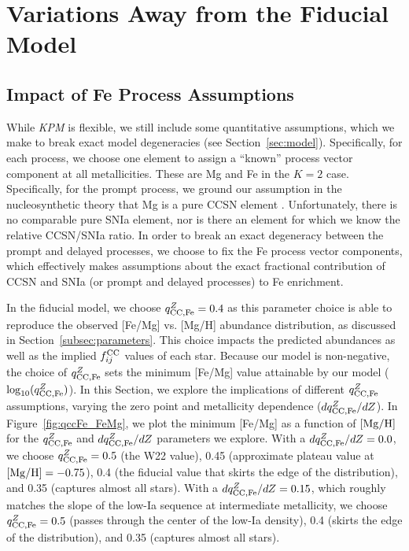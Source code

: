 \documentclass[modern]{aastex631}
\newcommand{\mgh}{[{\rm Mg}/{\rm H}]}
\newcommand{\qccFe}{q_{{\rm CC, Fe}}^{Z}}
\newcommand{\dqccFe}{dq_{{\rm CC, Fe}}^{Z}/dZ}
\newcommand{\fcc}{f_{ij}^{\rm CC}}
\newcommand{\name}{\textsl{KPM}}
\begin{document}
\section{Variations Away from the Fiducial Model} \label{sec:variations}

\subsection{Impact of Fe Process Assumptions} \label{subsec:qccFe}

While \name{} is flexible, we still include some quantitative assumptions, which we make to break exact model degeneracies (see Section~\ref{sec:model}).
Specifically, for each process, we choose one element to assign a ``known'' process vector component at all metallicities.
These are Mg and Fe in the $K=2$ case.
Specifically, for the prompt process, we ground our assumption in the nucleosynthetic theory that Mg is a pure CCSN element \citep[e.g.,][]{andrews2017}.
Unfortunately, there is no comparable pure SNIa element, nor is there an element for which we know the relative CCSN/SNIa ratio.
In order to break an exact degeneracy between the prompt and delayed processes, we choose to fix the Fe process vector components, which effectively makes assumptions about the exact fractional contribution of CCSN and SNIa (or prompt and delayed processes) to Fe enrichment.

In the fiducial model, we choose $\qccFe = 0.4$ as this parameter choice is able to reproduce the observed [Fe/Mg] vs. [Mg/H] abundance distribution, as discussed in Section~\ref{subsec:parameters}. This choice impacts the predicted abundances as well as the implied $\fcc$ values of each star. Because our model is non-negative, the choice of $\qccFe$ sets the minimum [Fe/Mg] value attainable by our model ($\log_{10}(\qccFe)$). In this Section, we explore the implications of different $\qccFe$ assumptions, varying the zero point and metallicity dependence ($\dqccFe$). In Figure~\ref{fig:qccFe_FeMg}, we plot the minimum [Fe/Mg] as a function of $\mgh$ for the $\qccFe$ and $\dqccFe$ parameters we explore. With a $\dqccFe=0.0$, we choose $\qccFe=0.5$ (the W22 value), 0.45 (approximate plateau value at $\mgh=-0.75$), 0.4 (the fiducial value that skirts the edge of the distribution), and 0.35 (captures almost all stars). With a $\dqccFe=0.15$, which roughly matches the slope of the low-Ia sequence at intermediate metallicity, we choose $\qccFe=0.5$ (passes through the center of the low-Ia density), 0.4 (skirts the edge of the distribution), and 0.35 (captures almost all stars).
\end{document}
